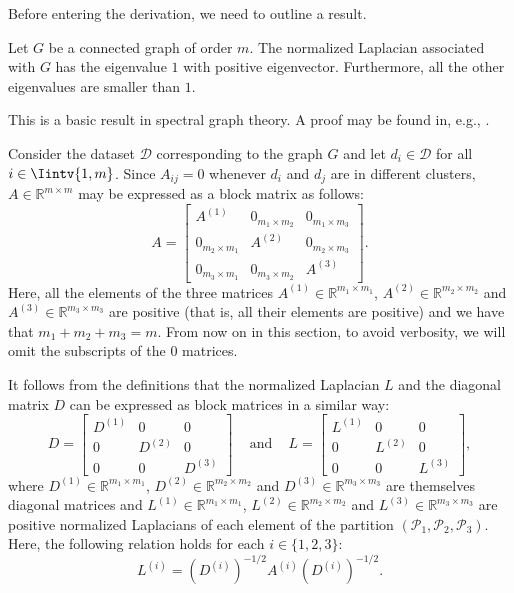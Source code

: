 Before entering the derivation, we need to outline a result.

\begin{proposition}
   \label{bigeigenvalue}
   Let $G$ be a connected graph of order $m$.
   The normalized Laplacian associated with $G$ has the eigenvalue $1$ with positive eigenvector.
   Furthermore, all the other eigenvalues are smaller than $1$.
\end{proposition}
This is a basic result in spectral graph theory.
A proof may be found in, e.g., \cite{mahoney}.

Consider the dataset $\mathcal D$ corresponding to the graph $G$ and let $d_i \in \mathcal D$ for all $i \in \Iintv{1,m}$. Since $A_{ij} = 0$ whenever $d_i$ and $d_j$ are in different clusters, $A \in \mathbb{R} ^{m \times m}$ may be expressed as a block matrix as follows:
\begin{equation}
   A = 
   \begin{bmatrix}
      A^{(1)} & 0_{m_1 \times m_2} & 0_{m_1 \times m_3} \\
      0_{m_2 \times m_1} & A^{(2)} & 0_{m_2 \times m_3} \\
      0_{m_3 \times m_1} & 0_{m_3 \times m_2} & A^{(3)}
   \end{bmatrix}.
\end{equation}
Here, all the elements of the three matrices $A^{(1)} \in \mathbb R^{m_1 \times m_1}$, $A^{(2)} \in \mathbb R^{m_2 \times m_2}$ and $A^{(3)} \in \mathbb R ^{m_3 \times m_3}$ are positive (that is, all their elements are positive) and we have that $m_1+m_2+m_3 = m$. 
From now on in this section, to avoid verbosity, we will omit the subscripts of the $0$ matrices.

It follows from the definitions that the normalized Laplacian $L$ and the diagonal matrix $D$ can be expressed as block matrices in a similar way:
\begin{equation}
 D =
   \begin{bmatrix}
      D^{(1)} & 0 & 0 \\
      0 & D^{(2)} & 0 \\
      0 & 0 & D^{(3)}
   \end{bmatrix}
   \,\,\,\,\,\text{ and }\,\,\,\,\,
   L = 
   \begin{bmatrix}
      L^{(1)} & 0 & 0 \\
      0 & L^{(2)} & 0 \\
      0 & 0 & L^{(3)}
   \end{bmatrix},
\end{equation}
where $D^{(1)} \in \mathbb R ^{m_1 \times m_1}$, $D^{(2)} \in \mathbb R ^{m_2 \times m_2}$ and $D^{(3)} \in \mathbb R ^{m_3 \times m_3}$ are themselves diagonal matrices and $L^{(1)} \in \mathbb R ^{m_1 \times m_1}$, $L^{(2)} \in \mathbb R ^{m_2 \times m_2}$ and $L^{(3)} \in \mathbb R ^{m_3 \times m_3}$ are positive normalized Laplacians of each element of the partition $(\mathcal P_1, \mathcal P_2, \mathcal P_3)$.
Here, the following relation holds for each $i \in \{1, 2, 3 \}$:
\begin{equation}
   L^{(i)} = \left( D^{(i)} \right) ^{-1/2} A^{(i)} \left( D^{(i)} \right) ^{-1/2}.
\end{equation}


